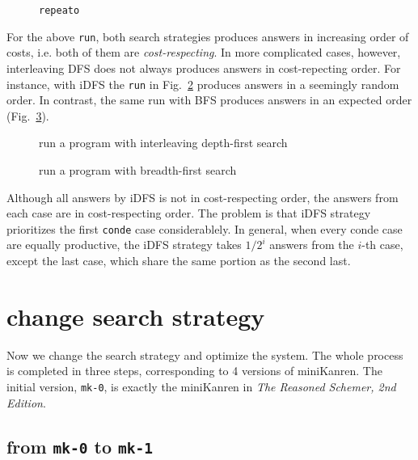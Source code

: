 \documentclass[format=acmlarge, review=true, authordraft=true]{acmart}
\begin{document}
\begin{figure}
  
  
  \caption{\texttt{repeato}}
  \label{def-repeato}
\end{figure}


For the above \texttt{run}, both search strategies produces answers in increasing order of costs, i.e. both of them are \emph{cost-respecting}. In more complicated cases, however, interleaving DFS does not always produces answers in cost-repecting order. For instance, with iDFS the \texttt{run} in Fig.~\ref{conde-repeato-iDFS} produces answers in a seemingly random order. In contrast, the same run with BFS produces answers in an expected order (Fig.~\ref{conde-repeato-BFS}).

\begin{figure}
	
	\caption{run a program with interleaving depth-first search}
	\label{conde-repeato-iDFS}
\end{figure}

\begin{figure}
	
	\caption{run a program with breadth-first search}
	\label{conde-repeato-BFS}
\end{figure}

Although all answers by iDFS is not in cost-respecting order, the answers from each case are in cost-respecting order. The problem is that iDFS strategy prioritizes the first \texttt{conde} case considerablely. In general, when every conde case are equally productive, the iDFS strategy takes $1/2^{i}$ answers from the $i$-th case, except the last case, which share the same portion as the second last.




\section{change search strategy}

Now we change the search strategy and optimize the system. The whole process is completed in three steps, corresponding to 4 versions of miniKanren. The initial version, \texttt{mk-0}, is exactly the miniKanren in \emph{The Reasoned Schemer, 2nd Edition}.

\subsection{from \texttt{mk-0} to \texttt{mk-1}}
\end{document}
